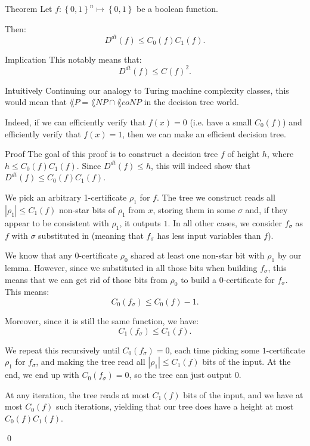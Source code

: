 \documentclass[a4paper]{article}
\begin{document}
\begin{parag}{Theorem}
    Let $f: \left\{0, 1\right\}^n \mapsto \left\{0, 1\right\}$ be a boolean function.

    Then: 
    \[D^{dt}\left(f\right) \leq C_0\left(f\right) C_1\left(f\right).\]

    \begin{subparag}{Implication}
        This notably means that: 
        \[D^{dt}\left(f\right) \leq C\left(f\right)^2.\]
    \end{subparag}

    \begin{subparag}{Intuitively}
        Continuing our analogy to Turing machine complexity classes, this would mean that $\lang{P} = \lang{NP} \cap \lang{coNP}$ in the decision tree world.

        Indeed, if we can efficiently verify that $f\left(x\right) = 0$ (i.e. have a small $C_0\left(f\right)$) and efficiently verify that $f\left(x\right) = 1$, then we can make an efficient decision tree.
    \end{subparag}
   
    \begin{subparag}{Proof}
        The goal of this proof is to construct a decision tree $f$ of height $h$, where $h \leq C_0\left(f\right) C_1\left(f\right)$. Since $D^{dt}\left(f\right) \leq h$, this will indeed show that $D^{dt}\left(f\right) \leq C_0\left(f\right)C_1\left(f\right)$.

        We pick an arbitrary 1-certificate $\rho_1$ for $f$. The tree we construct reads all $\left|\rho_1\right| \leq C_1\left(f\right)$ non-star bits of $\rho_1$ from $x$, storing them in some $\sigma$ and, if they appear to be consistent with $\rho_1$, it outputs $1$. In all other cases, we consider $f_{\sigma}$ as $f$ with $\sigma$ substituted in (meaning that $f_{\sigma}$ has less input variables than $f$).

        We know that any 0-certificate $\rho_0$ shared at least one non-star bit with $\rho_1$ by our lemma. However, since we substituted in all those bits when building $f_{\sigma}$, this means that we can get rid of those bits from $\rho_0$ to build a 0-certificate for $f_{\sigma}$. This means: 
        \[C_0\left(f_{\sigma}\right) \leq C_0\left(f\right) - 1.\]
        
        Moreover, since it is still the same function, we have: 
        \[C_1\left(f_{\sigma}\right) \leq C_1\left(f\right).\]

        We repeat this recursively until $C_0\left(f_{\sigma}\right) = 0$, each time picking some $1$-certificate $\rho_1$ for $f_{\sigma}$, and making the tree read all $\left|\rho_1\right| \leq C_1\left(f\right)$ bits of the input. At the end, we end up with $C_0\left(f_{\sigma}\right) = 0$, so the tree can just output $0$.

        At any iteration, the tree reads at most $C_1\left(f\right)$ bits of the input, and we have at most $C_0\left(f\right)$ such iterations, yielding that our tree does have a height at most $C_0\left(f\right) C_1\left(f\right)$.

        \qed
    \end{subparag}
\end{parag}
\end{document}
